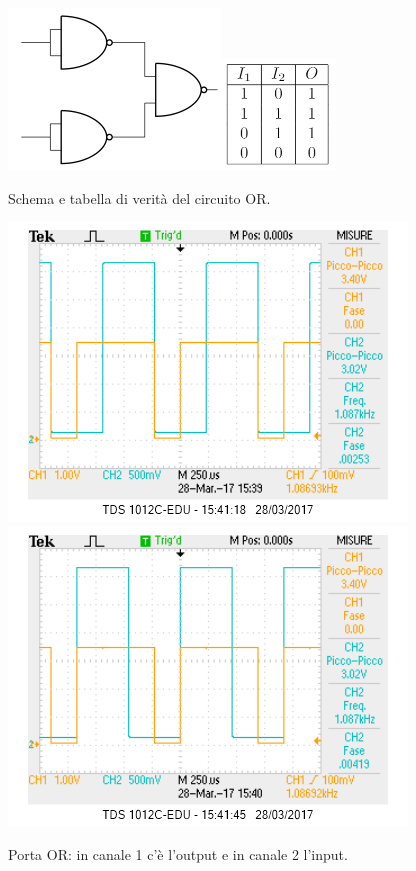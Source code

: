 \documentclass[10pt,a4paper]{article}
\begin{document}
\begin{figure}[!htb]
  \centering
  \includegraphics[scale=0.9]{or.png}\includegraphics[scale=0.9]{tabOR.png}
\caption{Schema e tabella di verità del circuito OR.\label{fig:OR}}
\end{figure}

\begin{figure}[!htb]
  \centering
  \includegraphics[scale=0.75]{or1.png}\includegraphics[scale=0.75]{or2.png}
\caption{Porta OR: in canale 1 c'è l'output e in canale 2 l'input.\label{osc:OR}}
\end{figure}
\end{document}
